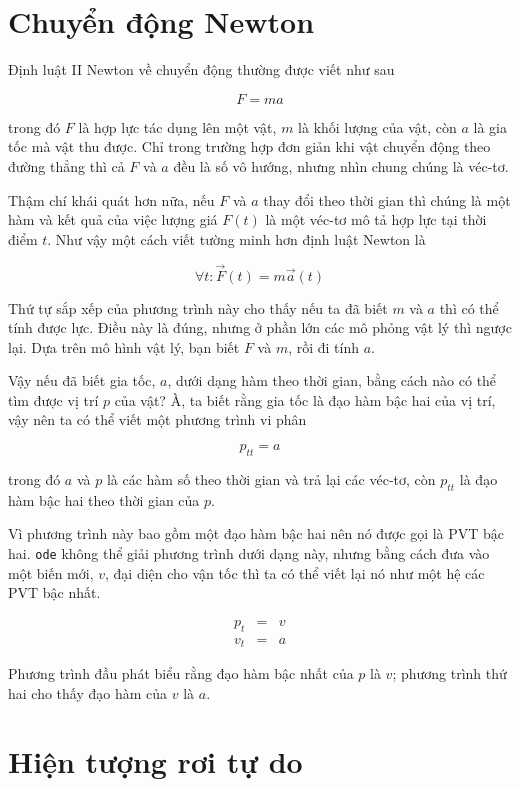 \documentclass[12pt]{book}
\begin{document}
\section{Chuyển động Newton}

Định luật II Newton về chuyển động thường được viết như sau

\[ F = ma \]

trong đó $F$ là hợp lực tác dụng lên một vật, $m$ là khối lượng của
vật, còn $a$ là gia tốc mà vật thu được. Chỉ trong trường hợp đơn giản
khi vật chuyển động theo đường thẳng thì cả $F$ và $a$ đều là 
số vô hướng, nhưng nhìn chung chúng là véc-tơ.

Thậm chí khái quát hơn nữa, nếu $F$ và $a$ thay đổi theo thời gian
thì chúng là một hàm và kết quả của việc lượng giá $F(t)$ là một
véc-tơ mô tả hợp lực tại thời điểm $t$. Như vậy một cách viết 
tường minh hơn định luật Newton là

\[ \forall t: \vec{F}(t) = m \vec{a}(t) \]

Thứ tự sắp xếp của phương trình này cho thấy nếu ta đã biết $m$ 
và $a$ thì có thể tính được lực. Điều này là đúng, nhưng ở
phần lớn các mô phỏng vật lý thì ngược lại. Dựa trên mô hình 
vật lý, bạn biết $F$ và $m$, rồi đi tính $a$.

Vậy nếu đã biết gia tốc, $a$, dưới dạng hàm theo thời gian, bằng
cách nào có thể tìm được vị trí $p$ của vật? À, ta biết rằng gia tốc
là đạo hàm bậc hai của vị trí, vậy nên ta có thể viết một phương
trình vi phân

\[ p_{tt} = a \]

trong đó $a$ và $p$ là các hàm số theo thời gian và trả lại các
véc-tơ, còn $p_{tt}$ là đạo hàm bậc hai theo thời gian của $p$.

Vì phương trình này bao gồm một đạo hàm bậc hai nên nó được gọi là
PVT bậc hai. {\tt ode} không thể giải phương trình dưới dạng này,
nhưng bằng cách đưa vào một biến mới, $v$, đại diện cho vận tốc
thì ta có thể viết lại nó như một hệ các PVT bậc nhất.

\begin{eqnarray*}
p_t &=& v \\
v_t &=& a
\end{eqnarray*}

Phương trình đầu phát biểu rằng đạo hàm bậc nhất của $p$ là $v$; 
phương trình thứ hai cho thấy đạo hàm của $v$ là $a$.


\section{Hiện tượng rơi tự do}
\label{freefall}
\end{document}
